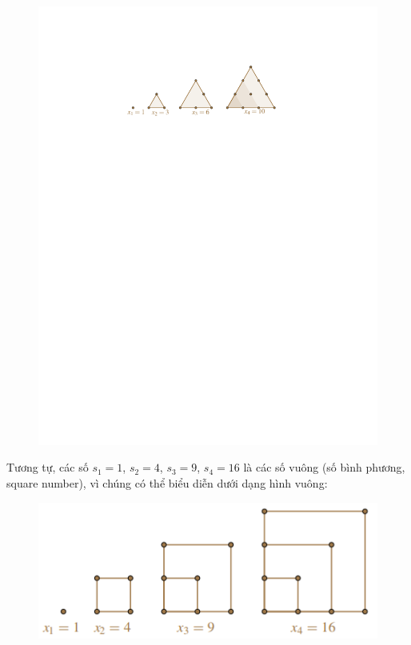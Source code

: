 \begin{multicols}{2}
\begin{figure}[H]
		\includegraphics[width= 1\linewidth]{5}
		\vspace*{-10pt}
	\end{figure}
	Tương tự, các số $s_1 = 1$, $s_2 = 4$, $s_3 = 9$, $s_4 = 16$ là các số vuông (số bình phương, square number), vì chúng có thể biểu diễn dưới dạng hình vuông:
	\begin{figure}[H]
		\centering
		\captionsetup{labelformat= empty, justification=centering}
		\includegraphics[width= 1\linewidth]{6}

\end{figure}
\end{multicols}
